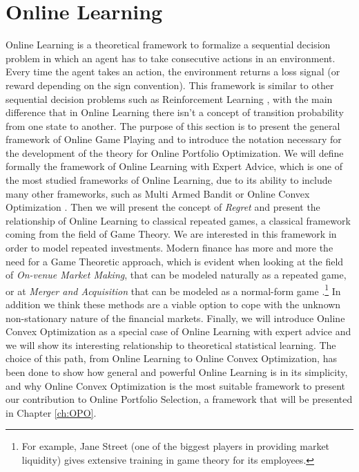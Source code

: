 \chapter{Online Learning}\label{ch:OnlineLearning}

Online Learning is a theoretical framework to formalize a sequential decision problem in which an agent has to take consecutive actions in an environment. Every time the agent takes an action, the environment returns a loss signal (or reward depending on the sign convention). This framework is similar to other sequential decision problems such as Reinforcement Learning \cite{sutton2018reinforcement}, with the main difference that in Online Learning there isn't a concept of transition probability from one state to another.
The purpose of this section is to present the general framework of Online Game Playing and to introduce the notation necessary for the development of the theory for Online Portfolio Optimization. We will define formally the framework of Online Learning with Expert Advice, which is one of the most studied frameworks of Online Learning, due to its ability to include many other frameworks, such as Multi Armed Bandit \cite{bubeck2012regret} or Online Convex Optimization \cite{hazan2016introduction}.
Then we will present the concept of \emph{Regret} and present the relationship of Online Learning to classical repeated games, a classical framework coming from the field of Game Theory. 
We are interested in this framework in order to model repeated investments.
Modern finance has more and more the need for a Game Theoretic approach, which is evident when looking at the field of \emph{On-venue Market Making}, that can be modeled naturally as a repeated game, or at \emph{Merger and Acquisition} that can be modeled as a normal-form game \cite{Yanqing_MaA}.\footnote{For example, Jane Street (one of the biggest players in providing market liquidity) gives extensive training in game theory for its employees.} In addition we think these methods are a viable option to cope with the unknown non-stationary nature of the financial markets.
Finally, we will introduce Online Convex Optimization as a special case of Online Learning with expert advice and we will show its interesting relationship to theoretical statistical learning. The choice of this path, from Online Learning to Online Convex Optimization, has been done to show how general and powerful Online Learning is in its simplicity, and why Online Convex Optimization is the most suitable framework to present our contribution to Online Portfolio Selection, a framework that will be presented in Chapter \ref{ch:OPO}.

